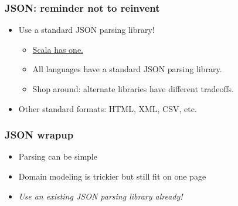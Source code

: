

\begin{frame}
  \frametitle{JSON: reminder not to reinvent}

  \begin{itemize}
    \item Use a standard JSON parsing library!
      \begin{itemize}
        \item \href{http://www.scala-lang.org/api/current/index.html\#scala.util.parsing.json.JSON$}{Scala has one.}
        \item All languages have a standard JSON parsing library.
        \item Shop around: alternate libraries have different tradeoffs.
      \end{itemize}
    \item Other standard formats: HTML, XML, CSV, etc.
  \end{itemize}
\end{frame}


\begin{frame}
  \frametitle{JSON wrapup}

  \begin{itemize}
    \item Parsing can be simple
    \item Domain modeling is trickier but still fit on one page
    \item \emph{Use an existing JSON parsing library already!} 
  \end{itemize}
\end{frame}

%

